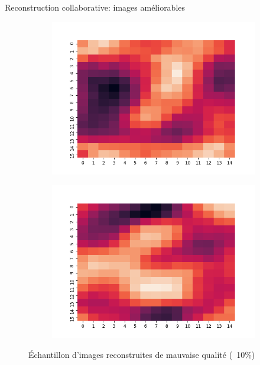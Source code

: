 \documentclass[hyperref={pdfpagelabels=false}]{beamer}
\begin{document}
\begin{frame}{Reconstruction collaborative: images améliorables}
\begin{figure}[h]
\begin{subfigure}[c]{0.18\textwidth}
                \includegraphics[scale=.12]{88}
            \end{subfigure}
            \begin{subfigure}[c]{0.18\textwidth}
                \includegraphics[scale=.12]{99}
            \end{subfigure}
            \caption{Échantillon d'images reconstruites de mauvaise qualité 
            (~10\%)}
        \end{figure}
    \end{frame}
\end{document}
